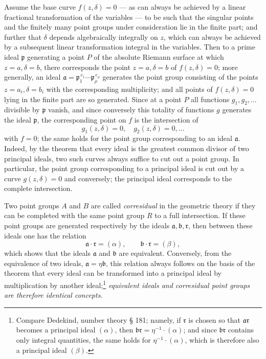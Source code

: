 \documentclass[11pt]{article}
\providecommand{\frp}{\mathfrak p}
\providecommand{\fra}{\mathfrak a}
\providecommand{\frb}{\mathfrak b}
\providecommand{\frr}{\mathfrak r}
\begin{document}
Assume the base curve \(f(z,\delta)=0\) --- as can always be achieved by a linear fractional transformation of the variables --- to be such that the singular points and the finitely many point groups under consideration lie in the finite part; and further that \(\delta\) depends algebraically integrally on \(z\), which can always be achieved by a subsequent linear transformation integral in the variables. Then to a prime ideal \(\frp\) generating a point \(P\) of the absolute Riemann surface at which \(z=a,\delta=b\), there corresponds the point \(z=a,\delta=b\) of \(f(z,\delta)=0\); more generally, an ideal \(\fra=\frp_1^{\,e_1}\cdots\frp_\rho^{\,e_\rho}\) generates the point group consisting of the points \(z=a_i,\delta=b_i\) with the corresponding multiplicity; and all points of \(f(z,\delta)=0\) lying in the finite part are so generated. Since at a point \(P\) all functions \(g_1,g_2,\ldots\) divisible by \(\frp\) vanish, and since conversely this totality of functions \(g\) generates the ideal \(\frp\), the corresponding point on \(f\) is the intersection of
\[
g_1(z,\delta)=0,\quad g_2(z,\delta)=0,\ldots
\]
with \(f=0\); the same holds for the point group corresponding to an ideal \(\fra\). Indeed, by the theorem that every ideal is the greatest common divisor of two principal ideals, two such curves always suffice to cut out a point group. In particular, the point group corresponding to a principal ideal is cut out by a curve \(g(z,\delta)=0\) and conversely; the principal ideal corresponds to the complete intersection.

Two point groups \(A\) and \(B\) are called \emph{corresidual} in the geometric theory if they can be completed with the same point group \(R\) to a full intersection. If these point groups are generated respectively by the ideals \(\fra,\frb,\frr\), then between these ideals one has the relation
\[
\fra\cdot\frr=(\alpha),\qquad \frb\cdot\frr=(\beta),
\]
which shows that the ideals \(\fra\) and \(\frb\) are equivalent. Conversely, from the equivalence of two ideals, \(\fra=\eta\frb\), this relation always follows on the basis of the theorem that every ideal can be transformed into a principal ideal by multiplication by another ideal;\footnote{Compare Dedekind, number theory § 181; namely, if \(\frr\) is chosen so that \(\fra\frr\) becomes a principal ideal \((\alpha)\), then \(\frb\frr=\eta^{-1}\cdot(\alpha)\); and since \(\frb\frr\) contains only integral quantities, the same holds for \(\eta^{-1}\cdot(\alpha)\), which is therefore also a principal ideal \((\beta)\).} \emph{equivalent ideals and corresidual point groups are therefore identical concepts.}
\end{document}
